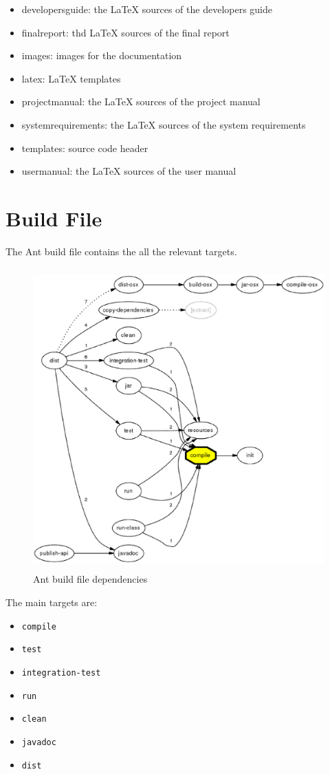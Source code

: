 \documentclass[11pt,a4paper]{article}
\begin{document}
\begin{itemize}
 \item developersguide: the \LaTeX{} sources of the developers guide
 \item finalreport: thd \LaTeX{} sources of the final report
 \item images: images for the documentation
 \item latex: \LaTeX{} templates
 \item projectmanual: the \LaTeX{} sources of the project manual
 \item systemrequirements: the \LaTeX{} sources of the system requirements
 \item templates: source code header
 \item usermanual: the \LaTeX{} sources of the user manual
\end{itemize}

\section{Build File}

The Ant build file contains the all the relevant targets.
\begin{figure}[H]
 \centering
 \includegraphics[width=15cm,height=11.6cm]{../images/developersguide/ant-graph.eps}
 \caption{Ant build file dependencies}
\end{figure}

The main targets are:
\begin{itemize}
 \item \texttt{compile}
 \item \texttt{test}
 \item \texttt{integration-test}
 \item \texttt{run}
 \item \texttt{clean}
 \item \texttt{javadoc}
 \item \texttt{dist}
\end{itemize}
\end{document}
